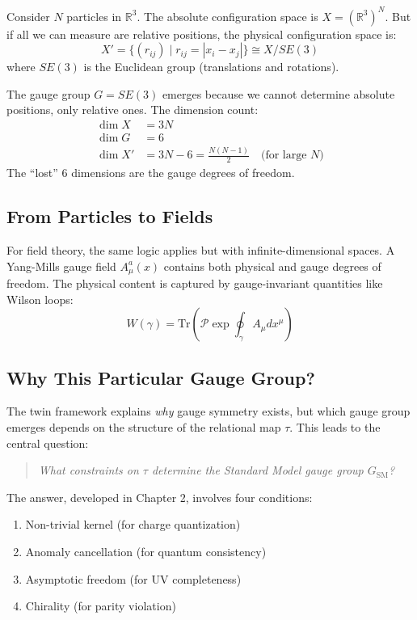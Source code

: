 \documentclass[11pt,a4paper,openright]{book}
\theoremstyle{plain}
\theoremstyle{definition}
\newcommand{\SM}{\mathrm{SM}}
\newcommand{\Tr}{\mathrm{Tr}}
\newcommand{\R}{\mathbb{R}}
\begin{document}
Consider $N$ particles in $\R^3$. The absolute configuration space is $X = (\R^3)^N$. But if all we can measure are relative positions, the physical configuration space is:
\begin{equation}
X' = \{(r_{ij}) \mid r_{ij} = |x_i - x_j|\} \cong X / SE(3)
\end{equation}
where $SE(3)$ is the Euclidean group (translations and rotations).

The gauge group $G = SE(3)$ emerges because we cannot determine absolute positions, only relative ones. The dimension count:
\begin{align}
\dim X &= 3N \\
\dim G &= 6 \\
\dim X' &= 3N - 6 = \frac{N(N-1)}{2} \quad \text{(for large } N\text{)}
\end{align}
The ``lost'' 6 dimensions are the gauge degrees of freedom.

\subsection{From Particles to Fields}

For field theory, the same logic applies but with infinite-dimensional spaces. A Yang-Mills gauge field $A_\mu^a(x)$ contains both physical and gauge degrees of freedom. The physical content is captured by gauge-invariant quantities like Wilson loops:
\begin{equation}
W(\gamma) = \Tr\left(\mathcal{P} \exp\oint_\gamma A_\mu dx^\mu\right)
\end{equation}

\subsection{Why This Particular Gauge Group?}

The twin framework explains \emph{why} gauge symmetry exists, but which gauge group emerges depends on the structure of the relational map $\tau$. This leads to the central question:

\begin{quote}
\textit{What constraints on $\tau$ determine the Standard Model gauge group $G_{\SM}$?}
\end{quote}

The answer, developed in Chapter 2, involves four conditions:
\begin{enumerate}[label=(C\arabic*)]
    \item Non-trivial kernel (for charge quantization)
    \item Anomaly cancellation (for quantum consistency)
    \item Asymptotic freedom (for UV completeness)
    \item Chirality (for parity violation)
\end{enumerate}
\end{document}
